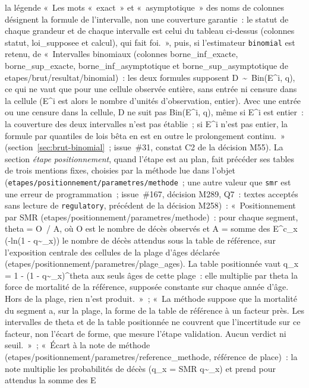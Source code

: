 \documentclass[a4paper,11pt]{article}
\newcommand{\code}[1]{\texttt{\small #1}}
\begin{document}
la légende «~Les mots «~exact~» et «~asymptotique~» des noms de colonnes
désignent la formule de l'intervalle, non une couverture garantie~: le
statut de chaque grandeur et de chaque intervalle est celui du tableau
ci-dessus (colonnes statut, loi\_supposee et calcul), qui fait foi.~», puis,
si l'estimateur \code{binomial} est retenu, de «~Intervalles binomiaux
(colonnes borne\_inf\_exacte, borne\_sup\_exacte, borne\_inf\_asymptotique et
borne\_sup\_asymptotique de etapes/brut/resultat/binomial)~: les deux
formules supposent D~\textasciitilde{}~Bin(E\^{}i, q), ce qui ne vaut que pour
une cellule observée entière, sans entrée ni censure dans la cellule
(E\^{}i est alors le nombre d'unités d'observation, entier). Avec une
entrée ou une censure dans la cellule, D ne suit pas Bin(E\^{}i, q), même si
E\^{}i est entier~: la couverture des deux intervalles n'est pas établie~;
si E\^{}i n'est pas entier, la formule par quantiles de lois bêta en est en
outre le prolongement continu.~» (section~\ref{sec:brut-binomial}~;
issue~\#31, constat C2 de la décision M55). La section \emph{étape
positionnement}, quand l'étape est au plan, fait précéder ses tables de
trois mentions fixes, choisies par la méthode lue dans l'objet
(\code{etapes/positionnement/parametres/methode}~; une autre valeur que
\code{smr} est une erreur de programmation~; issue~\#167, décision M289,
Q7~: textes acceptés sans lecture de \code{regulatory}, précédent de la
décision M258)~: «~Positionnement par SMR
(etapes/positionnement/parametres/methode)~: pour chaque segment, theta =
O~/ A, où O est le nombre de décès observés et A = somme des E\^{}c\_x
(-ln(1 - q\textasciitilde{}\_x)) le nombre de décès attendus sous la table de
référence, sur l'exposition centrale des cellules de la plage d'âges
déclarée (etapes/positionnement/parametres/plage\_ages). La table
positionnée vaut q\_x = 1 - (1 - q\textasciitilde{}\_x)\^{}theta aux seuls
âges de cette plage~: elle multiplie par theta la force de mortalité de la
référence, supposée constante sur chaque année d'âge. Hors de la plage,
rien n'est produit.~»~; «~La méthode suppose que la mortalité du segment
a, sur la plage, la forme de la table de référence à un facteur près. Les
intervalles de theta et de la table positionnée ne couvrent que
l'incertitude sur ce facteur, non l'écart de forme, que mesure l'étape
validation. Aucun verdict ni seuil.~»~; «~Écart à la note de méthode
(etapes/positionnement/parametres/reference\_methode, référence de
place)~: la note multiplie les probabilités de décès (q\_x = SMR
q\textasciitilde{}\_x) et prend pour attendus la somme des E
\end{document}
